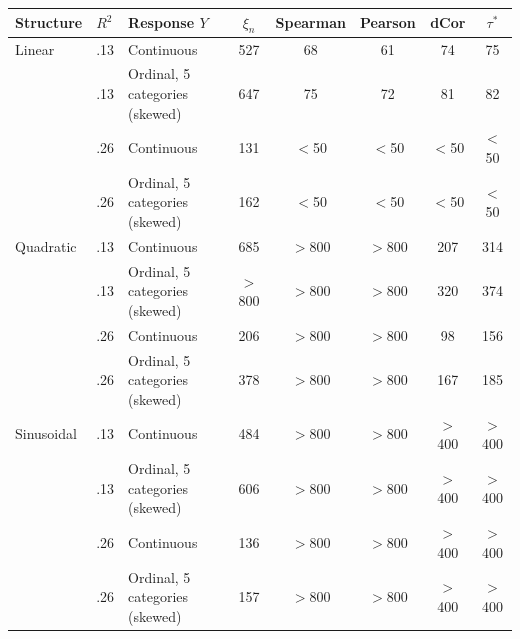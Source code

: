 \begin{tabular}{lllccccc}
\toprule
Structure & $R^2$ & Response $Y$ & $\xi_n$ & Spearman & Pearson & dCor & $\tau^*$ \\
\midrule
Linear & .13 & Continuous & 527 & 68 & 61 & 74 & 75 \\
 & .13 & Ordinal, 5 categories (skewed) & 647 & 75 & 72 & 81 & 82 \\
 & .26 & Continuous & 131 & $<$50 & $<$50 & $<$50 & $<$50 \\
 & .26 & Ordinal, 5 categories (skewed) & 162 & $<$50 & $<$50 & $<$50 & $<$50 \\
\addlinespace
Quadratic & .13 & Continuous & 685 & $>$800 & $>$800 & 207 & 314 \\
 & .13 & Ordinal, 5 categories (skewed) & $>$800 & $>$800 & $>$800 & 320 & 374 \\
 & .26 & Continuous & 206 & $>$800 & $>$800 & 98 & 156 \\
 & .26 & Ordinal, 5 categories (skewed) & 378 & $>$800 & $>$800 & 167 & 185 \\
\addlinespace
Sinusoidal & .13 & Continuous & 484 & $>$800 & $>$800 & $>$400 & $>$400 \\
 & .13 & Ordinal, 5 categories (skewed) & 606 & $>$800 & $>$800 & $>$400 & $>$400 \\
 & .26 & Continuous & 136 & $>$800 & $>$800 & $>$400 & $>$400 \\
 & .26 & Ordinal, 5 categories (skewed) & 157 & $>$800 & $>$800 & $>$400 & $>$400 \\
\bottomrule
\end{tabular}
